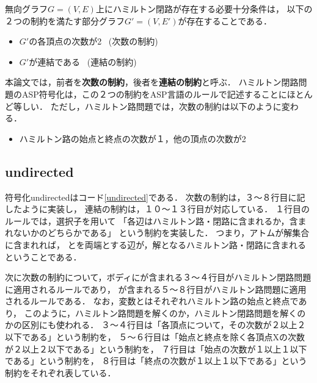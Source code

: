 無向グラフ$G=(V,E)$上にハミルトン閉路が存在する必要十分条件は，
以下の２つの制約を満たす部分グラフ$G'=(V,E')$が存在することである．\\
\begin{itemize}
\item $G'$の各頂点の次数が2 \ (次数の制約)\\
\item $G'$が連結である \ (連結の制約)\\
\end{itemize}
本論文では，前者を\textbf{次数の制約}，後者を\textbf{連結の制約}と呼ぶ．
ハミルトン閉路問題のASP符号化は，この２つの制約をASP言語のルールで記述することにほとんど等しい．
ただし，ハミルトン路問題では，次数の制約は以下のように変わる．\\
\begin{itemize}
\item ハミルトン路の始点と終点の次数が１，他の頂点の次数が2\\
\end{itemize}

\subsection{undirected}


符号化undirectedはコード\ref{undirected}である．
次数の制約は，３〜８行目に記したように実装し，
連結の制約は，１０〜１３行目が対応している．
１行目のルールでは，選択子を用いて
「各辺はハミルトン路・閉路に含まれるか，含まれないかのどちらかである」
という制約を実装した．
つまり，アトムが解集合に含まれれば，
とを両端とする辺が，解となるハミルトン路・閉路に含まれるということである．

次に次数の制約について，ボディにが含まれる３〜４行目がハミルトン閉路問題に適用されるルールであり，
が含まれる５〜８行目がハミルトン路問題に適用されるルールである．
なお，変数とはそれぞれハミルトン路の始点と終点であり，
このように，ハミルトン路問題を解くのか，ハミルトン閉路問題を解くのかの区別にも使われる．
３〜４行目は「各頂点について，その次数が２以上２以下である」という制約を，
５〜６行目は「始点と終点を除く各頂点Xの次数が２以上２以下である」という制約を，
７行目は「始点の次数が１以上１以下である」という制約を，
８行目は「終点の次数が１以上１以下である」という制約をそれぞれ表している．

